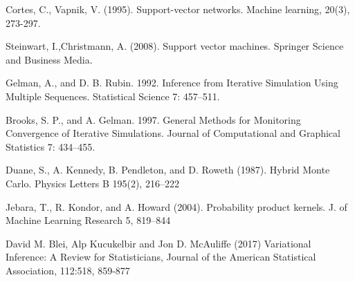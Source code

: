 \begin{thebibliography}{A}
 Cortes, C., Vapnik, V. (1995). Support-vector networks. Machine learning, 20(3), 273-297.

 Steinwart, I.,Christmann, A. (2008). Support vector machines. Springer Science and Business Media.

 Gelman, A., and D. B. Rubin. 1992. Inference from Iterative Simulation Using Multiple Sequences. Statistical Science 7: 457–511.

 Brooks, S. P., and A. Gelman. 1997. General Methods for Monitoring Convergence of Iterative Simulations. Journal of Computational and Graphical Statistics 7: 434–455.

 Duane, S., A. Kennedy, B. Pendleton, and D. Roweth (1987). Hybrid Monte Carlo. Physics Letters B 195(2), 216–222

 Jebara, T., R. Kondor, and A. Howard (2004). Probability product kernels. J. of Machine Learning Research 5, 819–844

 David M. Blei, Alp Kucukelbir and Jon D. McAuliffe (2017) Variational Inference: A Review for Statisticians, Journal of the American Statistical Association, 112:518, 859-877

\end{thebibliography}

